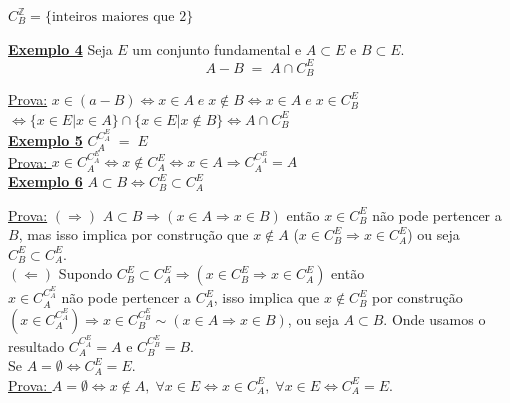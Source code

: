 \noindent
$ C_B^{\mathbb{Z}} = \{ \text{inteiros maiores que 2} \} $ 


\noindent
\textbf{\underline{Exemplo 4}} Seja $E$ um conjunto fundamental e $ A \subset E $ e $ B \subset E $.
$$ A - B \; = \; A \cap C_B^E $$

\noindent
\underline{Prova:} $ x \in (a - B)  \Leftrightarrow x \in A \; e \; x \notin B \Leftrightarrow  x \in A \; e \; x \in C_B^E $ \\
$ \Leftrightarrow \{ x \in E | x \in A \} \cap \{ x \in E | x \notin B \} \Leftrightarrow A \cap C_B^E $ \\

\noindent
\textbf{\underline{Exemplo 5}} $ C_A^{C_A^E} \; = \; E $ \\

\noindent
\underline{Prova: } $ x \in C_A^{C_A^E} \Leftrightarrow x \notin C_A^E \Leftrightarrow x \in A \Rightarrow C_A^{C_A^E} = A $ \\

\noindent
\textbf{\underline{Exemplo 6}}  $ A \subset B \Leftrightarrow C_B^E \subset C_A^E $ 

\noindent
\underline{Prova:} $(\Rightarrow)$ $ A \subset B \Rightarrow (x \in A \Rightarrow x \in B) $ então $ x \in C_B^E $ não pode pertencer a $B$, mas isso implica por construção que $x \notin A$ ($ x \in C_B^E \Rightarrow x \in C_A^E$) ou seja $ C_B^E \subset C_A^E $. \\

\noindent
$( \Leftarrow )$ Supondo $ C_B^E \subset C_A^E \Rightarrow ( x \in C_B^E \Rightarrow x \in C_A^E) $  então \\ $ x \in C_A^{C_A^E} $ não pode pertencer a $ C_A^E $, isso implica que $x \notin C_B^E $ por construção $ ( x \in C_A^{C_A^E}) \Rightarrow x \in C_B^{C_B^E} \sim (x \in A \Rightarrow x \in B )$, ou seja $ A \subset B $. Onde usamos o resultado $ C_A^{C_A^E} = A $ e $ C_B^{C_B^E} = B $. \\

\noindent
\text{\maltese } Se $ A = \emptyset \Leftrightarrow C_A^E = E $. \\

\noindent
\underline{Prova: } $ A = \emptyset \Leftrightarrow x \notin A, \; \forall x \in E \Leftrightarrow x \in C_A^E, \; \forall x \in E \Leftrightarrow C_A^E = E $. \\


